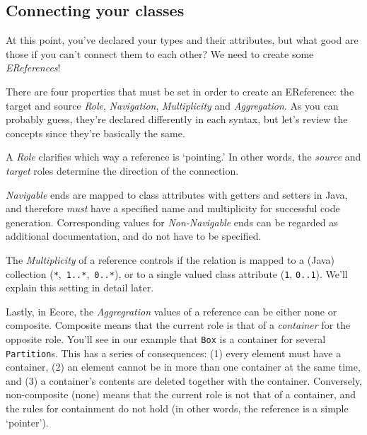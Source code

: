 \newpage
\subsection{Connecting your classes}
\genHeader
\hypertarget{static:references splash}{}

At this point, you've declared your types and their attributes, but what good are those if you can't connect them to each other? We need to create some
\emph{EReferences}!

There are four properties that must be set in order to create an EReference: the target and source \emph{Role}, \emph{Navigation}, \emph{Multiplicity} and
\emph{Aggregation}. As you can probably guess, they're declared differently in each syntax, but let's review the concepts since they're basically the same.

A \emph{Role} clarifies which way a reference is `pointing.' In other words, the \emph{source} and \emph{target} roles determine the direction of the
connection.

\emph{Navigable} ends are mapped to class attributes with getters and setters in Java, and therefore \emph{must} have a specified name and
multiplicity for successful code generation. Corresponding values for \emph{Non-Navigable} ends can  be regarded as additional documentation, and do not have
to be specified.

The \emph{Multiplicity} of a reference controls if the relation is mapped to a (Java) collection (\texttt{*},~\texttt{1..*},~\texttt{0..*}), or to a single
valued class attribute (\texttt{1}, \texttt{0..1}). We'll explain this setting in detail later.

Lastly, in Ecore, the \emph{Aggregration} values of a reference can be either none or com\-po\-site. Composite means that the current role is that of a
\emph{container} for the opposite role. You'll see in our example that \texttt{Box} is a container for several \texttt{Partition}s.
This has a series of consequences: (1) every element must have a container, (2) an element cannot be in more than one container at the same time, and (3) a
container's contents are deleted together with the container. Conversely, non-composite (none) means that the current role is not that of a container,
and the rules for containment do not hold (in other words, the reference is a simple `pointer').





